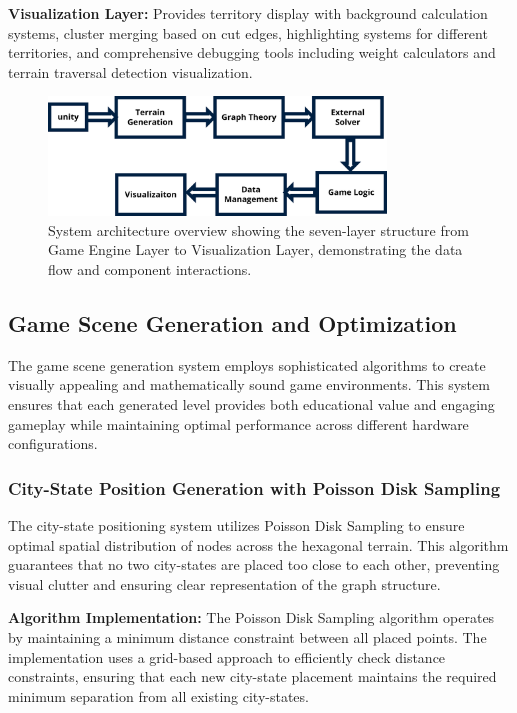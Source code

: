 \documentclass[english]{tudscrreprt}
\begin{document}
\textbf{Visualization Layer:} Provides territory display with background calculation systems, cluster merging based on cut edges, highlighting systems for different territories, and comprehensive debugging tools including weight calculators and terrain traversal detection visualization.

\begin{figure}[h]
\centering
\includegraphics[width=0.8\textwidth]{figures/system_architecture.png}
\caption{System architecture overview showing the seven-layer structure from Game Engine Layer to Visualization Layer, demonstrating the data flow and component interactions.}
\label{fig:system_architecture}
\end{figure}

\subsection{Game Scene Generation and Optimization}
The game scene generation system employs sophisticated algorithms to create visually appealing and mathematically sound game environments. This system ensures that each generated level provides both educational value and engaging gameplay while maintaining optimal performance across different hardware configurations.

\subsubsection{City-State Position Generation with Poisson Disk Sampling}
The city-state positioning system utilizes Poisson Disk Sampling to ensure optimal spatial distribution of nodes across the hexagonal terrain. This algorithm guarantees that no two city-states are placed too close to each other, preventing visual clutter and ensuring clear representation of the graph structure.

\textbf{Algorithm Implementation:}
The Poisson Disk Sampling algorithm operates by maintaining a minimum distance constraint between all placed points. The implementation uses a grid-based approach to efficiently check distance constraints, ensuring that each new city-state placement maintains the required minimum separation from all existing city-states.
\end{document}
